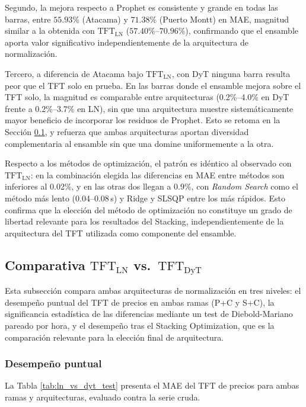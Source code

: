 Segundo, la mejora respecto a Prophet es consistente y grande en todas las barras, entre $55.93\%$ (Atacama) y $71.38\%$ (Puerto Montt) en MAE, magnitud similar a la obtenida con $\text{TFT}_\text{LN}$ ($57.40\%$--$70.96\%$), confirmando que el ensamble aporta valor significativo independientemente de la arquitectura de normalización.

Tercero, a diferencia de Atacama bajo $\text{TFT}_\text{LN}$, con DyT ninguna barra resulta peor que el TFT solo en prueba. En las barras donde el ensamble mejora sobre el TFT solo, la magnitud es comparable entre arquitecturas (0.2\%--4.0\% en DyT frente a 0.2\%--3.7\% en LN), sin que una arquitectura muestre sistemáticamente mayor beneficio de incorporar los residuos de Prophet. Esto se retoma en la Sección \ref{sec:ln_vs_dyt}, y refuerza que ambas arquitecturas aportan diversidad complementaria al ensamble sin que una domine uniformemente a la otra.

Respecto a los métodos de optimización, el patrón es idéntico al observado con $\text{TFT}_\text{LN}$: en la combinación elegida las diferencias en MAE entre métodos son inferiores al 0.02\%, y en las otras dos llegan a 0.9\%, con \textit{Random Search} como el método más lento (0.04--0.08\,s) y Ridge y SLSQP entre los más rápidos. Esto confirma que la elección del método de optimización no constituye un grado de libertad relevante para los resultados del Stacking, independientemente de la arquitectura del TFT utilizada como componente del ensamble.

\subsection{Comparativa $\text{TFT}_\text{LN}$ vs.\ $\text{TFT}_\text{DyT}$}
\label{sec:ln_vs_dyt}

Esta subsección compara ambas arquitecturas de normalización en tres niveles: el desempeño puntual del TFT de precios en ambas ramas (P+C y S+C), la significancia estadística de las diferencias mediante un test de Diebold-Mariano pareado por hora, y el desempeño tras el Stacking Optimization, que es la comparación relevante para la elección final de arquitectura.

\subsubsection{Desempeño puntual}

La Tabla \ref{tab:ln_vs_dyt_test} presenta el MAE del TFT de precios para ambas ramas y arquitecturas, evaluado contra la serie cruda.

